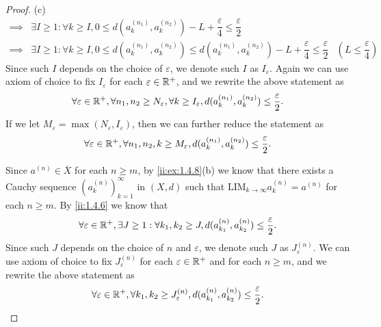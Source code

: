 \begin{proof}{(c)}
\begin{align*}
    \implies & \exists I \geq 1 : \forall k \geq I, 0 \leq d(a_k^{(n_1)}, a_k^{(n_2)}) - L + \dfrac{\varepsilon}{4} \leq \dfrac{\varepsilon}{2}                                                                    \\
    \implies & \exists I \geq 1 : \forall k \geq I, 0 \leq d(a_k^{(n_1)}, a_k^{(n_2)}) \leq d(a_k^{(n_1)}, a_k^{(n_2)}) - L + \dfrac{\varepsilon}{4} \leq \dfrac{\varepsilon}{2} & (L \leq \dfrac{\varepsilon}{4})
  \end{align*}
  Since such \(I\) depends on the choice of \(\varepsilon\), we denote such \(I\) as \(I_\varepsilon\).
  Again we can use axiom of choice to fix \(I_\varepsilon\) for each \(\varepsilon \in \mathbb{R}^+\), and we rewrite the above statement as
  \[
    \forall \varepsilon \in \mathbb{R}^+, \forall n_1, n_2 \geq N_\varepsilon, \forall k \geq I_\varepsilon, d(a_k^{(n_1)}, a_k^{(n_2)}) \leq \dfrac{\varepsilon}{2}.
  \]
  If we let \(M_\varepsilon = \max(N_\varepsilon, I_\varepsilon)\), then we can further reduce the statement as
  \[
    \forall \varepsilon \in \mathbb{R}^+, \forall n_1, n_2, k \geq M_\varepsilon, d(a_k^{(n_1)}, a_k^{(n_2)}) \leq \dfrac{\varepsilon}{2}.
  \]

  Since \(a^{(n)} \in \overline{X}\) for each \(n \geq m\), by \cref{ii:ex:1.4.8}(b) we know that there exists a Cauchy sequence \((a_k^{(n)})_{k = 1}^\infty\) in \((X, d)\) such that \(\text{LIM}_{k \to \infty} a_k^{(n)} = a^{(n)}\) for each \(n \geq m\).
  By \cref{ii:1.4.6} we know that
  \[
    \forall \varepsilon \in \mathbb{R}^+, \exists J \geq 1 : \forall k_1, k_2 \geq J, d(a_{k_1}^{(n)}, a_{k_2}^{(n)}) \leq \dfrac{\varepsilon}{2}.
  \]
  Since such \(J\) depends on the choice of \(n\) and \(\varepsilon\), we denote such \(J\) as \(J_\varepsilon^{(n)}\).
  We can use axiom of choice to fix \(J_\varepsilon^{(n)}\) for each \(\varepsilon \in \mathbb{R}^+\) and for each \(n \geq m\), and we rewrite the above statement as
  \[
    \forall \varepsilon \in \mathbb{R}^+, \forall k_1, k_2 \geq J_\varepsilon^{(n)}, d(a_{k_1}^{(n)}, a_{k_2}^{(n)}) \leq \dfrac{\varepsilon}{2}.
  \]


\end{proof}
